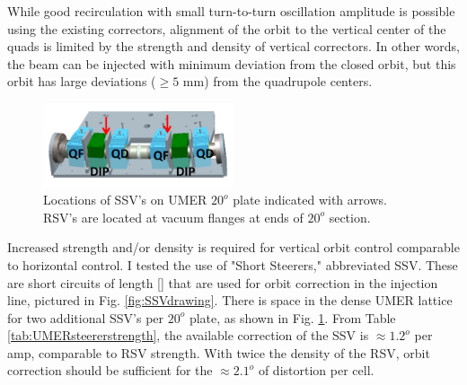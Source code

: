 
While good recirculation with small turn-to-turn oscillation amplitude is possible using the existing correctors, alignment of the orbit to the vertical center of the quads is limited by the strength and density of vertical correctors. In other words, the beam can be injected with minimum deviation from the closed orbit, but this orbit has large deviations ($\ge 5$ mm) from the quadrupole centers.  


\begin{figure}[]
\centering
\includegraphics[width=0.5\textwidth]{4.figures/SSV/SSVlocations.png}
\caption{Locations of SSV's on UMER $20^o$ plate indicated with arrows. RSV's are located at vacuum flanges at ends of $20^o$ section.}
\label{fig:SSVlocation}
\end{figure}

Increased strength and/or density is required for vertical orbit control comparable to horizontal control. I tested the use of "Short Steerers," abbreviated SSV. These are short circuits of length [] that are used for orbit correction in the injection line, pictured in Fig. \ref{fig:SSVdrawing}. There is space in the dense UMER lattice for two additional SSV's per $20^o$ plate, as shown in Fig. \ref{fig:SSVlocation}. From Table \ref{tab:UMERsteererstrength}, the available correction of the SSV is $\approx 1.2^o$ per amp, comparable to RSV strength. With twice the density of the RSV, orbit correction should be sufficient for the $\approx 2.1^o$ of distortion per cell.

